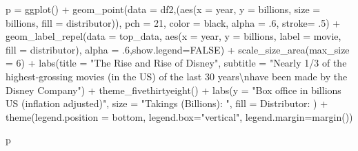 \documentclass[
  letterpaper,
  DIV=11,
  numbers=noendperiod]{scrreprt}
\newenvironment{Shaded}{\begin{snugshade}}{\end{snugshade}}
\newcommand{\AttributeTok}[1]{\textcolor[rgb]{0.40,0.45,0.13}{#1}}
\newcommand{\ConstantTok}[1]{\textcolor[rgb]{0.56,0.35,0.01}{#1}}
\newcommand{\DecValTok}[1]{\textcolor[rgb]{0.68,0.00,0.00}{#1}}
\newcommand{\FunctionTok}[1]{\textcolor[rgb]{0.28,0.35,0.67}{#1}}
\newcommand{\NormalTok}[1]{\textcolor[rgb]{0.00,0.23,0.31}{#1}}
\newcommand{\OtherTok}[1]{\textcolor[rgb]{0.00,0.23,0.31}{#1}}
\newcommand{\SpecialCharTok}[1]{\textcolor[rgb]{0.37,0.37,0.37}{#1}}
\newcommand{\StringTok}[1]{\textcolor[rgb]{0.13,0.47,0.30}{#1}}
\begin{document}
\begin{Shaded}
\begin{Highlighting}[]
\NormalTok{   p }\OtherTok{=}  \FunctionTok{ggplot}\NormalTok{() }\SpecialCharTok{+} 
      \FunctionTok{geom\_point}\NormalTok{(}\AttributeTok{data =}\NormalTok{ df2,(}\FunctionTok{aes}\NormalTok{(}\AttributeTok{x =}\NormalTok{ year, }
                                 \AttributeTok{y =}\NormalTok{ billions, }
                                 \AttributeTok{size =}\NormalTok{ billions, }
                                 \AttributeTok{fill =}\NormalTok{ distributor)), }
                 \AttributeTok{pch =} \DecValTok{21}\NormalTok{, }\AttributeTok{color =} \StringTok{\textquotesingle{}black\textquotesingle{}}\NormalTok{, }\AttributeTok{alpha =}\NormalTok{ .}\DecValTok{6}\NormalTok{, }\AttributeTok{stroke=}\NormalTok{ .}\DecValTok{5}\NormalTok{) }\SpecialCharTok{+} 
      \FunctionTok{geom\_label\_repel}\NormalTok{(}\AttributeTok{data =}\NormalTok{ top\_data, }\FunctionTok{aes}\NormalTok{(}\AttributeTok{x =}\NormalTok{ year, }
                                            \AttributeTok{y =}\NormalTok{ billions, }
                                            \AttributeTok{label =}\NormalTok{ movie, }
                                            \AttributeTok{fill =}\NormalTok{ distributor), }
                       \AttributeTok{alpha =}\NormalTok{ .}\DecValTok{6}\NormalTok{,}\AttributeTok{show.legend=}\ConstantTok{FALSE}\NormalTok{) }\SpecialCharTok{+} 
      \FunctionTok{scale\_size\_area}\NormalTok{(}\AttributeTok{max\_size =} \DecValTok{6}\NormalTok{) }\SpecialCharTok{+} 
      \FunctionTok{labs}\NormalTok{(}\AttributeTok{title =} \StringTok{"The Rise and Rise of Disney"}\NormalTok{, }
           \AttributeTok{subtitle =} \StringTok{"Nearly 1/3 of the highest{-}grossing movies (in the US) of the last 30 years}\SpecialCharTok{\textbackslash{}n}\StringTok{have been made by the Disney Company"}\NormalTok{) }\SpecialCharTok{+} 
      \FunctionTok{theme\_fivethirtyeight}\NormalTok{() }\SpecialCharTok{+} 
      \FunctionTok{labs}\NormalTok{(}\AttributeTok{y =} \StringTok{"Box office in billions US (inflation adjusted)"}\NormalTok{, }
           \AttributeTok{size =} \StringTok{"Takings (Billions): "}\NormalTok{, }\AttributeTok{fill =} \StringTok{\textquotesingle{}Distributor: \textquotesingle{}}\NormalTok{) }\SpecialCharTok{+} 
      \FunctionTok{theme}\NormalTok{(}\AttributeTok{legend.position =} \StringTok{\textquotesingle{}bottom\textquotesingle{}}\NormalTok{, }
            \AttributeTok{legend.box=}\StringTok{"vertical"}\NormalTok{, }
            \AttributeTok{legend.margin=}\FunctionTok{margin}\NormalTok{())}

                
\NormalTok{p}
\end{Highlighting}
\end{Shaded}
\end{document}
